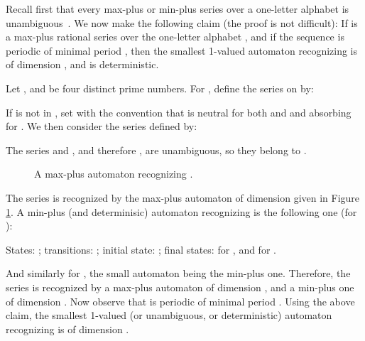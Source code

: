 \documentclass{article}
\newcommand{\1}{\mathbb{1}}
\newcommand{\0}{\mathbb{0}}
\begin{document}
\medskip

Recall first that every max-plus or min-plus series over a one-letter alphabet is
unambiguous~\cite{BoKr,moll}.
We now make the following claim (the proof is not difficult): 
If  is a max-plus rational series over the one-letter alphabet
, and if the sequence  is periodic
of minimal period , then the smallest 1-valued automaton
recognizing  is of dimension , and is deterministic. 

Let , and  be four distinct prime numbers. For ,
define the series  on  by:

If  is not in , set
 with the convention that 
is neutral for both  and  and absorbing for .
We then consider the series  defined by:

The series  and , and therefore , are unambiguous, so
they belong to . 
\begin{figure}[ht]

\caption{A max-plus automaton recognizing .}\label{fi-last}
\end{figure}
The series  is recognized by the max-plus
automaton of dimension  given in Figure \ref{fi-last}. 
A min-plus (and determinisic) automaton recognizing  is the
following one (for ): 

States: ; transitions: ; initial state:
; final states:
 for , and
 for .

\medskip

And similarly for , the small
automaton being the min-plus one. 
Therefore, the series  is recognized by a max-plus automaton of
dimension , and a min-plus one of dimension . Now
observe that  is periodic of minimal period . 
Using the above claim, the smallest 1-valued (or unambiguous, or
deterministic) automaton recognizing  is of dimension . 
\end{document}

